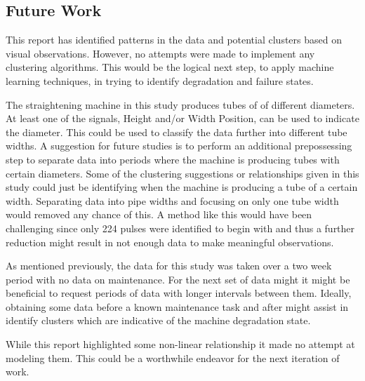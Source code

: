 \documentclass[]{article}
\begin{document}
\subsection{Future Work}
This report has identified patterns in the data and potential clusters based on visual observations. However, no attempts were made to implement any clustering algorithms. This would be the logical next step, to apply machine learning techniques, in trying to identify degradation and failure states.

The straightening machine in this study produces tubes of of different diameters. At least one of the signals, Height and/or Width Position, can be used to indicate the diameter. This could be used to classify the data further into different tube widths. A suggestion for future studies is to perform an additional prepossessing step to separate data into periods where the machine is producing tubes with certain diameters. Some of the clustering suggestions or relationships given in this study could just be identifying when the machine is producing a tube of a certain width. Separating data into pipe widths and focusing on only one tube width would removed any chance of this. A method like this would have been challenging since only 224 pulses were identified to begin with and thus a further reduction might result in not enough data to make meaningful observations.

As mentioned previously, the data for this study was taken over a two week period with no data on maintenance. For the next set of data might it might be beneficial to request periods of data with longer intervals between them. Ideally, obtaining some data before a known maintenance task and after might assist in identify clusters which are indicative of the machine degradation state.

While this report highlighted some non-linear relationship it made no attempt at modeling them. This could be a worthwhile endeavor for the next iteration of work.
\clearpage
\end{document}

